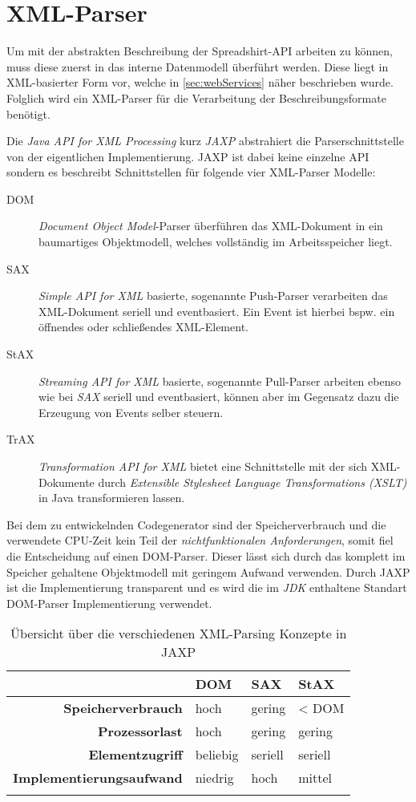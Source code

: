 \section{XML-Parser}
\label{sec:xml_parser}

Um mit der abstrakten Beschreibung der Spreadshirt-API arbeiten zu können, muss diese zuerst in das interne Datenmodell überführt werden. Diese liegt in XML-basierter Form vor, welche in \cref{sec:webServices} näher beschrieben wurde. Folglich wird ein XML-Parser für die Verarbeitung der Beschreibungsformate benötigt.  

Die \emph{Java API for XML Processing} kurz \emph{JAXP} abstrahiert die Parserschnittstelle von der eigentlichen Implementierung. JAXP ist dabei keine einzelne API sondern es beschreibt Schnittstellen für folgende vier XML-Parser Modelle:

\begin{description}
    \item[DOM] \emph{Document Object Model}-Parser überführen das XML-Dokument in ein baumartiges Objektmodell, welches vollständig im Arbeitsspeicher liegt.
    \item[SAX] \emph{Simple API for XML} basierte, sogenannte Push-Parser verarbeiten das XML-Dokument seriell und eventbasiert. Ein Event ist hierbei bspw. ein öffnendes oder schließendes XML-Element.
    \item[StAX] \emph{Streaming API for XML} basierte, sogenannte Pull-Parser arbeiten ebenso wie bei \emph{SAX} seriell und eventbasiert, können aber im Gegensatz dazu die Erzeugung von Events selber steuern. 
    \item[TrAX] \emph{Transformation API for XML} bietet eine Schnittstelle mit der sich XML-Dokumente durch \emph{Extensible Stylesheet Language Transformations (XSLT)} in Java transformieren lassen.
\end{description}

Bei dem zu entwickelnden Codegenerator sind der Speicherverbrauch und die verwendete CPU-Zeit kein Teil der \emph{nichtfunktionalen Anforderungen}, somit fiel die Entscheidung auf einen DOM-Parser. Dieser lässt sich durch das komplett im Speicher gehaltene Objektmodell mit geringem Aufwand verwenden. Durch JAXP ist die Implementierung transparent und es wird die im \emph{JDK} enthaltene Standart DOM-Parser Implementierung verwendet.

\begin{longtable}[tb]{r l l l}
    \toprule
    \rowcolor{lightgray}
    & \textbf{DOM}   & \textbf{SAX}   & \textbf{StAX} \\
    \midrule
    \textbf{Speicherverbrauch} & hoch & gering & \textless{} DOM\\
    \textbf{Prozessorlast} & hoch & gering & gering \\
    \textbf{Elementzugriff} & beliebig & seriell & seriell \\
    \textbf{Implementierungsaufwand} & niedrig & hoch & mittel \\
    \bottomrule
    \caption{Übersicht über die verschiedenen XML-Parsing Konzepte in JAXP}
    \label{tab:xmlParsingModels}
\end{longtable}
